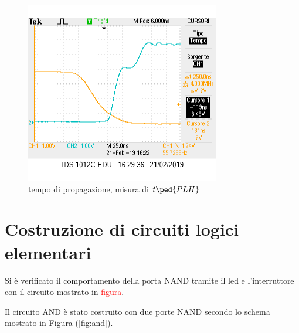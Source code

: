 \documentclass[10pt,a4paper]{article}
\begin{document}
\begin{figure}
			\centering
			\includegraphics[scale=0.85]{schifo2}
			\caption{tempo di propagazione, misura di $t\ped{PLH}$}
			\label{fig:plh}
\end{figure}
\section{Costruzione di circuiti logici elementari}
Si è verificato il comportamento della porta NAND tramite il led e l'interruttore con il circuito mostrato in \textcolor{red}{figura}.

Il circuito AND è stato costruito con due porte NAND secondo lo schema mostrato in Figura (\ref{fig:and}).
\end{document}
